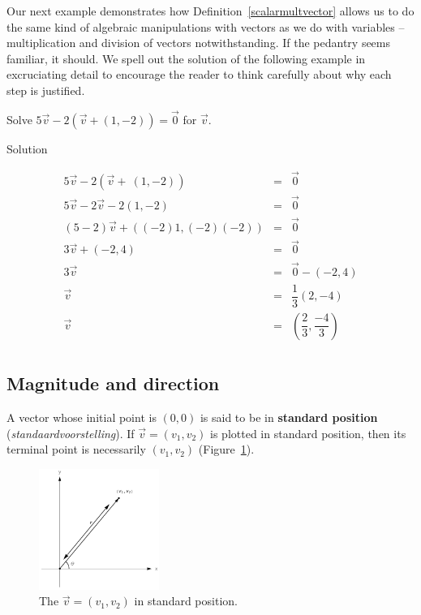 Our next example demonstrates how Definition~\ref{scalarmultvector} allows us to do the same kind of algebraic manipulations with vectors as we do with variables -- multiplication and division of vectors notwithstanding.  If the pedantry seems familiar, it should.  
We spell out the solution of the following example in excruciating detail to encourage the reader to think carefully about why each step is justified.
\fi


\begin{example} \label{vectoreqnex}  Solve $5\vec{v} - 2\left(\vec{v} + \left(1,-2\right)\right) = \vec{0}$ for $\vec{v}$.

\pagebreak
{}Solution 

\[ \begin{array}{rcl}

5\vec{v} - 2\left(\vec{v} +\ \left(1,-2\right)\right) & = &  \vec{0} \\
5\vec{v} - 2\vec{v} - 2\left(1,-2\right) & = &  \vec{0} \\
(5 - 2)\vec{v} +\left((-2)1,(-2)(-2)\right) & = &  \vec{0} \\
3\vec{v} +\left(-2,4\right) & = &  \vec{0} \\
3\vec{v} & = &  \vec{0}-\left(-2,4\right) \\
\vec{v} & = &  \dfrac{1}{3}\left(2,-4\right) \\[3pt]
\vec{v} & = &  \left(\dfrac{2}{3},\dfrac{-4}{3}\right) \\
\end{array} \]


\end{example}


\subsection{Magnitude and direction}
A vector whose initial point is $(0,0)$ is said to be in  \textbf{standard position} (\textit{standaardvoorstelling}).  If $\vec{v} = \left(v_1,v_2\right)$ is plotted in standard position, then its terminal point is necessarily $\left(v_1,v_2\right)$ (Figure~\ref{fig_vector_8}).

\begin{figure}[H]
	\begin{center}
			\includegraphics[width=0.35\textwidth]{fig_vector_8}
	\caption{The $\vec{v}= \left(v_1,v_2\right)$ in standard position. }
	\label{fig_vector_8}
	\end{center}
\end{figure}


